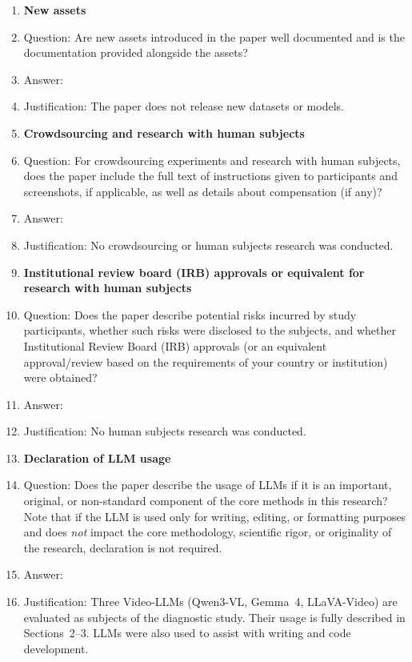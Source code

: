 \begin{enumerate}
\item {\bf New assets}
    \item[] Question: Are new assets introduced in the paper well documented and is the documentation provided alongside the assets?
    \item[] Answer: \answerNA{}
    \item[] Justification: The paper does not release new datasets or models.

\item {\bf Crowdsourcing and research with human subjects}
    \item[] Question: For crowdsourcing experiments and research with human subjects, does the paper include the full text of instructions given to participants and screenshots, if applicable, as well as details about compensation (if any)?
    \item[] Answer: \answerNA{}
    \item[] Justification: No crowdsourcing or human subjects research was conducted.

\item {\bf Institutional review board (IRB) approvals or equivalent for research with human subjects}
    \item[] Question: Does the paper describe potential risks incurred by study participants, whether such risks were disclosed to the subjects, and whether Institutional Review Board (IRB) approvals (or an equivalent approval/review based on the requirements of your country or institution) were obtained?
    \item[] Answer: \answerNA{}
    \item[] Justification: No human subjects research was conducted.

\item {\bf Declaration of LLM usage}
    \item[] Question: Does the paper describe the usage of LLMs if it is an important, original, or non-standard component of the core methods in this research? Note that if the LLM is used only for writing, editing, or formatting purposes and does \emph{not} impact the core methodology, scientific rigor, or originality of the research, declaration is not required.
    \item[] Answer: \answerYes{}
    \item[] Justification: Three Video-LLMs (Qwen3-VL, Gemma~4, LLaVA-Video) are evaluated as subjects of the diagnostic study. Their usage is fully described in Sections~2--3. LLMs were also used to assist with writing and code development.

\end{enumerate}
